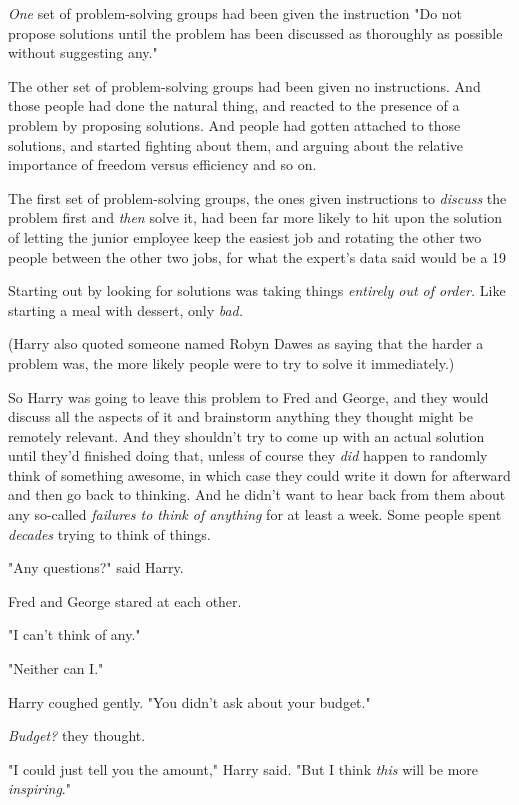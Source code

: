 \emph{One} set of problem-solving groups had been given the instruction "Do not 
propose solutions until the problem has been discussed as thoroughly as 
possible without suggesting any."

The other set of problem-solving groups had been given no instructions. And 
those people had done the natural thing, and reacted to the presence of a 
problem by proposing solutions. And people had gotten attached to those 
solutions, and started fighting about them, and arguing about the relative 
importance of freedom versus efficiency and so on.

The first set of problem-solving groups, the ones given instructions to 
\emph{discuss} the problem first and \emph{then} solve it, had been far more 
likely to hit upon the solution of letting the junior employee keep the easiest 
job and rotating the other two people between the other two jobs, for what the 
expert's data said would be a 19%

Starting out by looking for solutions was taking things\emph{ entirely out of 
order.} Like starting a meal with dessert, only \emph{bad.}

(Harry also quoted someone named Robyn Dawes as saying that the harder a 
problem was, the more likely people were to try to solve it immediately.)

So Harry was going to leave this problem to Fred and George, and they would 
discuss all the aspects of it and brainstorm anything they thought might be 
remotely relevant. And they shouldn't try to come up with an actual solution 
until they'd finished doing that, unless of course they \emph{did} happen to 
randomly think of something awesome, in which case they could write it down for 
afterward and then go back to thinking. And he didn't want to hear back from 
them about any so-called \emph{failures to think of anything} for at least a 
week. Some people spent \emph{decades} trying to think of things.

"Any questions?" said Harry.

Fred and George stared at each other.

"I can't think of any."

"Neither can I."

Harry coughed gently. "You didn't ask about your budget."

\emph{Budget?} they thought.

"I could just tell you the amount," Harry said. "But I think \emph{this} will 
be more \emph{inspiring}."

